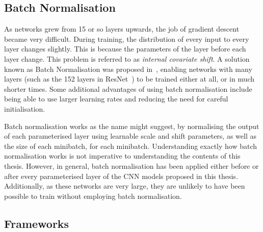 


\subsection{Batch Normalisation}

As networks grew from 15 or so layers upwards, the job of gradient
descent became very difficult. During training, the distribution of
every input to every layer changes slightly. This is because the
parameters of the layer before each layer change. This problem is
referred to as \textit{internal covariate shift}. A solution known as
Batch Normalisation was proposed in~\cite{ioffe2015batch}, enabling
networks with many layers (such as the 152 layers in
ResNet~\cite{he2015deep}) to be trained either at all, or in much
shorter times. Some additional advantages of using batch normalisation
include being able to use larger learning rates and reducing the need
for careful initialisation.

Batch normalisation works as the name might suggest, by normalising
the output of each parameterised layer using learnable scale and shift
parameters, as well as the size of each minibatch, for each
minibatch. Understanding exactly how batch normalisation works is not
imperative to understanding the contents of this thesis. However, in
general, batch normalisation has been applied either before or after
every parameterised layer of the CNN models proposed in this
thesis. Additionally, as these networks are very large, they are
unlikely to have been possible to train without employing batch
normalisation.


\subsection{Frameworks}

